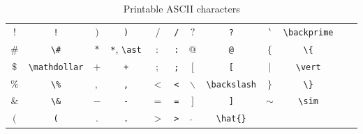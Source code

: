 \documentclass[captions=tableheading]{scrartcl}
\begin{document}
\begin{table}
  \caption{Printable \textsc{ASCII} characters}
  \label{tab:ascii}
  \centering
  \begin{tabular}[c]{cc@{\hskip 2.5em}cc@{\hskip 2.5em}cc@{\hskip 2.5em}cc@{\hskip 2.5em}cc@{\hskip 2.5em}cc}
    \toprule
    $!$ & \verb|!| & $)$ & \verb|)| & $/$ & \verb|/| & $?$ & \verb|?| &
    $\backprime$ & \verb|\backprime| \\
    $\#$ & \verb|\#| & $*$ & \verb|*|, \verb|\ast| & $:$ & \verb|:| &
    $@$ & \verb|@| & $\{$ & \verb|\{| \\
    $\mathdollar$ & \verb|\mathdollar| & $+$ & \verb|+| &
    $;$ & \verb|;| & $[$ & \verb|[| & $\vert$ & \verb|\vert| \\
    $\%$ & \verb|\%| & $,$ & \verb|,| & $<$ & \verb|<| &
    $\backslash$ & \verb|\backslash| & $\}$ & \verb|\}| \\
    $\&$ & \verb|\&| & $-$ & \verb|-| & $=$ & \verb|=| &
    $]$ & \verb|]| & $\sim$ & \verb|\sim| \\
    $($ & \verb|(| & $.$ & \verb|.| & $>$ & \verb|>| &
    $\hat{}$ & \verb|\hat{}| & & \\
    \bottomrule
  \end{tabular}
\end{table}
\end{document}
